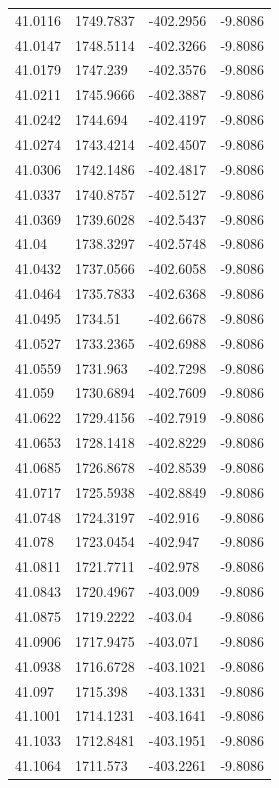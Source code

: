 \begin{table}[H]
\begin{tabular}{llll}
41.0116 & 1749.7837 & -402.2956 & -9.8086 \\
41.0147 & 1748.5114 & -402.3266 & -9.8086 \\
41.0179 & 1747.239 & -402.3576 & -9.8086 \\
41.0211 & 1745.9666 & -402.3887 & -9.8086 \\
41.0242 & 1744.694 & -402.4197 & -9.8086 \\
41.0274 & 1743.4214 & -402.4507 & -9.8086 \\
41.0306 & 1742.1486 & -402.4817 & -9.8086 \\
41.0337 & 1740.8757 & -402.5127 & -9.8086 \\
41.0369 & 1739.6028 & -402.5437 & -9.8086 \\
41.04 & 1738.3297 & -402.5748 & -9.8086 \\
41.0432 & 1737.0566 & -402.6058 & -9.8086 \\
41.0464 & 1735.7833 & -402.6368 & -9.8086 \\
41.0495 & 1734.51 & -402.6678 & -9.8086 \\
41.0527 & 1733.2365 & -402.6988 & -9.8086 \\
41.0559 & 1731.963 & -402.7298 & -9.8086 \\
41.059 & 1730.6894 & -402.7609 & -9.8086 \\
41.0622 & 1729.4156 & -402.7919 & -9.8086 \\
41.0653 & 1728.1418 & -402.8229 & -9.8086 \\
41.0685 & 1726.8678 & -402.8539 & -9.8086 \\
41.0717 & 1725.5938 & -402.8849 & -9.8086 \\
41.0748 & 1724.3197 & -402.916 & -9.8086 \\
41.078 & 1723.0454 & -402.947 & -9.8086 \\
41.0811 & 1721.7711 & -402.978 & -9.8086 \\
41.0843 & 1720.4967 & -403.009 & -9.8086 \\
41.0875 & 1719.2222 & -403.04 & -9.8086 \\
41.0906 & 1717.9475 & -403.071 & -9.8086 \\
41.0938 & 1716.6728 & -403.1021 & -9.8086 \\
41.097 & 1715.398 & -403.1331 & -9.8086 \\
41.1001 & 1714.1231 & -403.1641 & -9.8086 \\
41.1033 & 1712.8481 & -403.1951 & -9.8086 \\
41.1064 & 1711.573 & -403.2261 & -9.8086 \\

\end{tabular}
\end{table}
